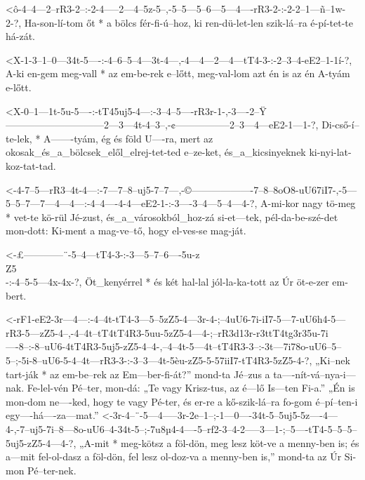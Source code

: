   {<ô-4--4---2--rR3-2--:-2-4-----2---4--5z-5--,-5--5---5--6---5---4----rR3-2-:-2-2--1---ñ--1w-2-?,}
  {   Ha-son-lí-tom őt * a bölcs fér-fi-ú--hoz, ki ren-dü-let-len szik-lá--ra  é-pí-tet-te há-zát.}

  {<X-1-3--1--0---34t-5----:-4--6--5--4---3t-4---,-4---4---2---4---tT4-3-:-2--3--4-eE2--1-1í-?,}
  {   A-ki en-gem meg-vall * az em-be-rek e--lőtt, meg-val-lom azt én  is  az én A-tyám e-lőtt.}

  {<X-0--1---1t-5u-5----:-tT45uj5-4---:-3--4--5----rR3r-1-,-3----2--Ÿ------------------------------2---3---4t-4--3--,-¢-----------------2--3---4---eE2-1---1-?,}
  {   Di-cső-í--te-lek, * A-------tyám, ég és föld U----ra, mert az okosak_és_a_bölcsek_elől_elrej-tet-ted e--ze-ket, és_a_kicsinyeknek ki-nyi-lat-koz-tat-tad.}

  {<-4-7--5---rR3--4t-4---:-7---7--8--uj5-7--7---,-©-------------------7--8--8oO8-uU67iI7-,-5---5--5--7---7---4---4---:-4--4----4-4---eE2-1-:-3----3--4---5--4---4-?,}
  {  A-mi-kor nagy tö-meg * vet-te kö-rül Jé-zust, és_a_városokból_hoz-zá si-et---tek,      pél-da-be-szé-det mon-dott: Ki-ment a mag-ve--tő, hogy el-ves-se mag-ját.}

  {<-£------------¨-5--4---tT4-3-:-3---5--7--6----5u-z\\Z5\\-:-4--5-5---4x-4x-?,}
  {  Öt_kenyérrel * és két hal-lal jól-la-ka-tott az Úr        öt-e-zer em-bert.}

  {<-rF1-eE2-3r---4---:-4--4t-tT4-3---5--5zZ5-4---3r-4-;--4uU6-7i-iI7-5---7-uU6h4-5---rR3-5---zZ5-4--,-4--4t--tT4tT4R3-5uu-5zZ5-4---4-;--rR3d13r-r3ttT4tg3r35u-7i----8--:-8--uU6-4tT4R3-5uj5-zZ5-4--4-,--4--4t-5---4t--tT4R3-3--:-3t---7i78o-uU6--5--5--;-5i-8--uU6-5-4--4t---rR3-3-:-3--3---4t-5èu-zZ5-5-57iiI7-tT4R3-5zZ5-4-?,}
  { „Ki--nek tart-ják * az em-be--rek az Em---ber-fi-át?” mond-ta Jé--zus a ta----nít-vá--nya-i---nak. Fe-lel-vén      Pé--ter, mon-dá: „Te      vagy          Krisz-tus, az é---lő     Is---ten Fi-a.” „Én is mon-dom ne----ked, hogy te    vagy Pé-ter, és er-re  a kő-szik-lá--ra  fo-gom é--pí--ten-i egy----há----za---mat.”}
  {<-3r-4--¨-5---4-----3r-2e--1--;-1---0----34t-5--5uj5-5z----4---4-,-7--uj5-7i--8---8o-uU6--4-34t-5--;-7u8µ4-4----5--rf2-3--4-2-----3---1-;--5----tT4-5--5--5--5uj5-zZ5-4---4-?,}
  { „A-mit * meg-kötsz a  föl-dön, meg lesz köt-ve a    menny-ben is; és a---mit fel-ol-dasz a föl-dön, fel   lesz ol-doz-va a menny-ben is,” mond-ta  az Úr Si-mon  Pé--ter-nek.}

